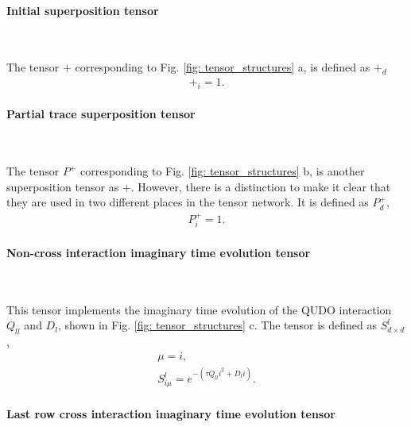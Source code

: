 \documentclass[%
 reprint,
 amsmath,amssymb,
 aps,
 pra,showkeys,
]{revtex4-2}
\begin{document}
\paragraph{Initial superposition tensor}

$ $

The tensor $+$ corresponding to Fig. \ref{fig: tensor_structures} a, is defined as $+_{d}$
\begin{equation}
    \begin{gathered}
        +_{i} = 1.
    \end{gathered}
\end{equation}

\paragraph{Partial trace superposition tensor}

$ $


The tensor $P^+$ corresponding to Fig. \ref{fig: tensor_structures} b, is another superposition tensor as $+$. However, there is a distinction to make it clear that they are used in two different places in the tensor network. It is defined as $P^+_{d}$,
\begin{equation}
    \begin{gathered}
        P^+_{i} = 1.
    \end{gathered}
\end{equation}



\paragraph{Non-cross interaction imaginary time evolution tensor}

$ $


This tensor implements the imaginary time evolution of the QUDO interaction $Q_{ll}$ and $D_l$, shown in Fig. \ref{fig: tensor_structures} c. The tensor is defined as $S^l_{d\times d}$,  
\begin{equation}
    \begin{gathered}
        \mu = i,\\
        S^l_{i\mu} = e^{- (\tau Q_{ll} i^2+D_li)}.
    \end{gathered}
\end{equation}

\paragraph{Last row cross interaction imaginary time evolution tensor}
\end{document}
